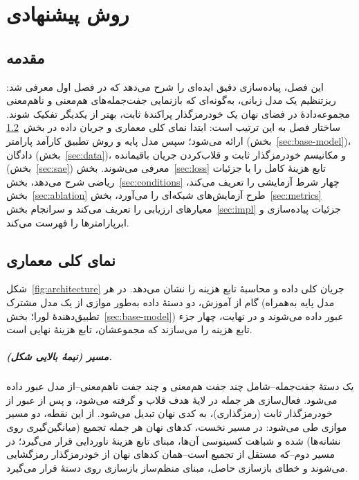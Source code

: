 
\chapter{روش پیشنهادی}
\label{ch:method}

\section{مقدمه}
این فصل، پیاده‌سازی دقیق ایده‌ای را شرح می‌دهد که در فصل اول معرفی شد: ریزتنظیم یک مدل زبانی، به‌گونه‌ای که بازنمایی جفت‌جمله‌های هم‌معنی و ناهم‌معنی مجموعه‌دادهٔ
در فضای نهان یک خودرمزگذار پراکندهٔ ثابت، بهتر از یکدیگر تفکیک شوند. ساختار فصل به این ترتیب است: ابتدا نمای کلی معماری و جریان داده در بخش~\ref{sec:overview} ارائه می‌شود؛ سپس مدل پایه و روش تطبیق کارآمد پارامتر (بخش~\ref{sec:base-model})، دادگان (بخش~\ref{sec:data})، و مکانیسم خودرمزگذار ثابت و قلاب‌کردن جریان باقیمانده (بخش~\ref{sec:sae}) معرفی می‌شوند. بخش~\ref{sec:loss} تابع هزینهٔ کامل را با جزئیات ریاضی شرح می‌دهد، بخش~\ref{sec:conditions} چهار شرط آزمایشی را تعریف می‌کند، بخش~\ref{sec:ablation} طرح آزمایش‌های شبکه‌ای را می‌آورد، بخش~\ref{sec:metrics} معیارهای ارزیابی را تعریف می‌کند و سرانجام بخش~\ref{sec:impl} جزئیات پیاده‌سازی و ابرپارامترها را فهرست می‌کند.

\section{نمای کلی معماری}
\label{sec:overview}
شکل~\ref{fig:architecture} جریان کلی داده و محاسبهٔ تابع هزینه را نشان می‌دهد. در هر گام از آموزش، دو دستهٔ داده به‌طور موازی از یک مدل مشترک (مدل پایه به‌همراه تطبیق‌دهندهٔ لورا؛ بخش~\ref{sec:base-model}) عبور داده می‌شوند و در نهایت، چهار جزء تابع هزینه را می‌سازند که مجموعشان، تابع هزینهٔ نهایی است.

\paragraph{مسیر  (نیمهٔ بالایی شکل).}
یک دستهٔ جفت‌جمله--شامل چند جفت هم‌معنی و چند جفت ناهم‌معنی--از مدل عبور داده می‌شود. فعال‌سازی هر جمله در لایهٔ هدف قلاب و گرفته می‌شود، و پس از عبور از خودرمزگذار ثابت (رمزگذاری)، به کدی نهان تبدیل می‌شود. از این نقطه، دو مسیر موازی طی می‌شود: در مسیر نخست، کدهای نهان هر جمله تجمیع (میانگین‌گیری روی نشانه‌ها) شده و شباهت کسینوسی آن‌ها، مبنای تابع هزینهٔ ناوردایی قرار می‌گیرد؛ در مسیر دوم--که مستقل از تجمیع است--همان کدهای نهان از خودرمزگذار رمزگشایی می‌شوند و خطای بازسازی حاصل، مبنای منظم‌ساز بازسازی روی دستهٔ
قرار می‌گیرد.

